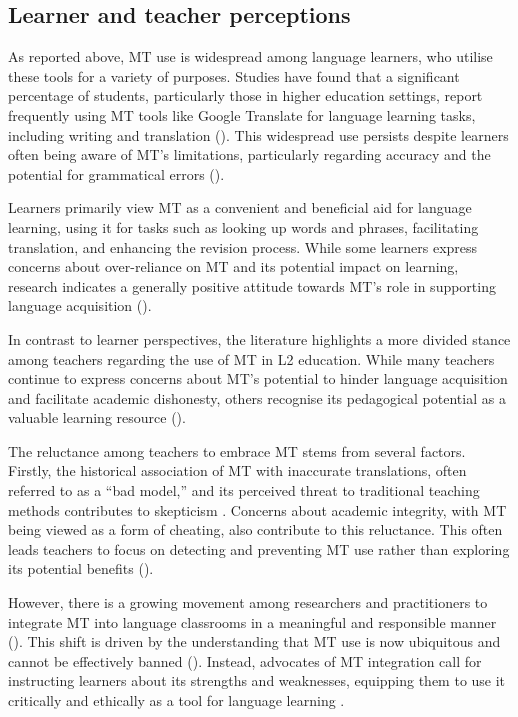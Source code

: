 \documentclass[output=paper]{langscibook}
\begin{document}
\subsection{Learner and teacher perceptions}

As reported above, MT use is widespread among language learners, who utilise these tools for a variety of purposes. Studies have found that a significant percentage of students, particularly those in higher education settings, report frequently using MT tools like Google Translate for language learning tasks, including writing and translation (\citealt{lee20, tsai2019}). This widespread use persists despite learners often being aware of MT’s limitations, particularly regarding accuracy and the potential for grammatical errors (\citealt{jolley22}).

Learners primarily view MT as a convenient and beneficial aid for language learning, using it for tasks such as looking up words and phrases, facilitating translation, and enhancing the revision process. While some learners express concerns about over-reliance on MT and its potential impact on learning, research indicates a generally positive attitude towards MT’s role in supporting language acquisition (\citealt{chungahn22}).

In contrast to learner perspectives, the literature highlights a more divided stance among teachers regarding the use of MT in L2 education. While many teachers continue to express concerns about MT’s potential to hinder language acquisition and facilitate academic dishonesty, others recognise its pedagogical potential as a valuable learning resource (\citealt{ducarschocket18}).

The reluctance among teachers to embrace MT stems from several factors. Firstly, the historical association of MT with inaccurate translations, often referred to as a “bad model,” and its perceived threat to traditional teaching methods contributes to skepticism \citep{lo23_NMT-EFL}. Concerns about academic integrity, with MT being viewed as a form of cheating, also contribute to this reluctance. This often leads teachers to focus on detecting and preventing MT use rather than exploring its potential benefits (\citealt{jolley22}).

However, there is a growing movement among researchers and practitioners to integrate MT into language classrooms in a meaningful and responsible manner (\citealt{hellmich2023, lee20}). This shift is driven by the understanding that MT use is now ubiquitous and cannot be effectively banned (\citealt{ducarschocket18}). Instead, advocates of MT integration call for instructing learners about its strengths and weaknesses, equipping them to use it critically and ethically as a tool for language learning \citep{klimova22}.
\end{document}
